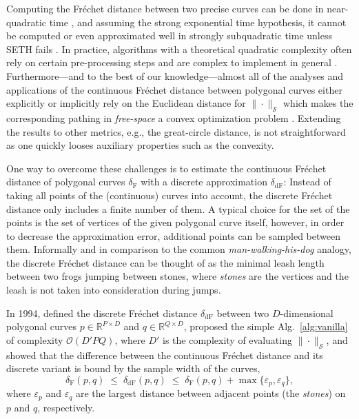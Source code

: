 Computing the Fr\'echet distance between two precise curves can be done in near-quadratic time \citep{agarwal14,alt95,buchin17}, and assuming the strong exponential time hypothesis, it cannot be computed or even approximated well in strongly subquadratic time unless SETH fails \citep{bringmann14,buchin19a}.
In practice, algorithms with a theoretical quadratic complexity often rely on certain pre-processing steps and are complex to implement in general \citep{bringmann19}.
Furthermore---and to the best of our knowledge---almost all of the analyses and applications of the continuous Fr\'echet distance between polygonal curves either explicitly or implicitly rely on the Euclidean distance for $\| \cdot \|_\mathcal{S}$ which makes the corresponding pathing in \textit{free-space} a convex optimization problem \citep{alt92,alt95}.
Extending the results to other metrics, e.g., the great-circle distance, is not straightforward as one quickly looses auxiliary properties such as the convexity.

One way to overcome these challenges is to estimate the continuous Fr\'echet distance of polygonal curves $\delta_\mathrm{F}$ with a discrete approximation $\delta_\mathrm{dF}$:
Instead of taking all points of the (continuous) curves into account, the discrete Fr\'echet distance only includes a finite number of them.
A typical choice for the set of the points is the set of vertices of the given polygonal curve itself, however, in order to decrease the approximation error, additional points can be sampled between them.
Informally and in comparison to the common \textit{man-walking-his-dog} analogy, the discrete Fr\'echet distance can be thought of as the minimal leash length between two frogs jumping between stones, where \textit{stones} are the vertices and the leash is not taken into consideration during jumps.

In 1994, \citet{eiter94} defined the discrete Fr\'echet distance $\delta_\mathrm{dF}$ between two $D$-dimensional polygonal curves $p \in \mathbb{R}^{P \times D}$ and $q \in \mathbb{R}^{Q \times D}$, proposed the simple Alg.~\ref{alg:vanilla} of complexity $\mathcal{O}(D'PQ)$, where $D'$ is the complexity of evaluating $\| \cdot \|_\mathcal{S}$, and showed that the difference between the continuous Fr\'echet distance and its discrete variant is bound by the sample width of the curves,
\begin{equation*}
    \delta_\mathrm{F}(p, q) \;\le\; \delta_\mathrm{dF}(p, q) \;\le\; \delta_\mathrm{F}(p, q) + \max\{ \varepsilon_p, \varepsilon_q \},
\end{equation*}
where $\varepsilon_p$ and $\varepsilon_q$ are the largest distance between adjacent points (the \textit{stones}) on $p$ and $q$, respectively.

